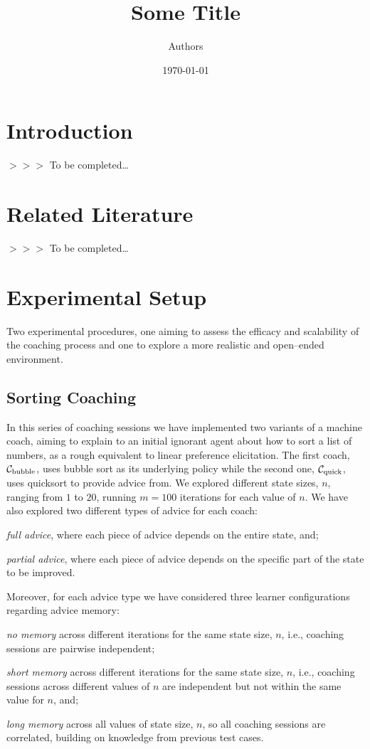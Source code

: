 \documentclass[a4paper, 10pt]{article}
\title{Some Title}
\author{Authors}
\date{\today}
\newcommand{\bubblecoach}{\ensuremath{\mathcal{C}_{\rm bubble}}}
\newcommand{\quickcoach}{\ensuremath{\mathcal{C}_{\rm quick}}}
\newcommand{\edcom}[1]{{\sf\color{red}$>>>$ #1}}
\newcommand{\tbc}{\edcom{To be completed\ldots}}
\newcommand{\ednote}[1]{\marginpar{\flushleft\tiny\sf\color{red}{#1}}}
\begin{document}
	\maketitle
	\section{Introduction}\label{sec:introduction}
	\tbc
	\section{Related Literature}\label{sec:related-literature}
	\tbc
	\section{Experimental Setup}\label{sec:experimental-setup}
	Two experimental procedures, one aiming to assess the efficacy and scalability of the coaching process and one to explore a more realistic and open--ended environment.\ednote{Add a few words about how coaching happens in the context of searching, i.e., how from a past sub--optimal state the coach provides a piece of advice according to their (implicit / explicit) policy that improves the state towards a(n implicit / explicit) goal.}
	\subsection{Sorting Coaching}\label{subsec:sorting-coaching}
	In this series of coaching sessions we have implemented two variants of a machine coach, aiming to explain to an initial ignorant agent about how to sort a list of numbers, as a rough equivalent to linear preference elicitation. The first coach, \bubblecoach, uses bubble sort as its underlying policy while the second one, \quickcoach, uses quicksort to provide advice from. We explored different state sizes, $n$, ranging from $1$ to $20$, running $m=100$ iterations for each value of $n$. We have also explored two different types of advice for each coach:
	\begin{enumerate*}[label=(A\arabic*)]
		\item \emph{full advice}, where each piece of advice depends on the entire state, and;
		\item \emph{partial advice}, where each piece of advice depends on the specific part of the state to be improved.
	\end{enumerate*}
	Moreover, for each advice type we have considered three learner configurations regarding advice memory:
	\begin{enumerate*}[label=(C\arabic*)]
		\item \emph{no memory} across different iterations for the same state size, $n$, i.e., coaching sessions are pairwise independent;
		\item \emph{short memory} across different iterations for the same state size, $n$, i.e., coaching sessions across different values of $n$ are independent but not within the same value for $n$, and;
		\item \emph{long memory} across all values of state size, $n$, so all coaching sessions are correlated, building on knowledge from previous test cases.
	\end{enumerate*}
\end{document}
